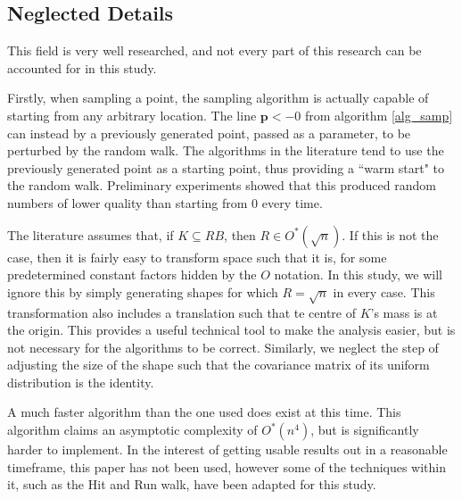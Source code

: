 \subsection{Neglected Details}

This field is very well researched, and not every part of this research can be accounted for in this study.

Firstly, when sampling a point, the sampling algorithm is actually capable of starting from any arbitrary location. The line ${\bm p} <- 0$ from algorithm \ref{alg_samp} can instead by a previously generated point, passed as a parameter, to be perturbed by the random walk. The algorithms in the literature tend to use the previously generated point as a starting point, thus providing a ``warm start" to the random walk. Preliminary experiments showed that this produced random numbers of lower quality than starting from $0$ every time.

The literature assumes that, if $K \subseteq RB$, then $R \in O^{*}(\sqrt{n})$. If this is not the case, then it is fairly easy to transform space such that it is, for some predetermined constant factors hidden by the $O$ notation. In this study, we will ignore this by simply generating shapes for which $R = \sqrt{n}$ in every case. This transformation also includes a translation such that te centre of $K$'s mass is at the origin. This provides a useful technical tool to make the analysis easier, but is not necessary for the algorithms to be correct. Similarly, we neglect the step of adjusting the size of the shape such that the covariance matrix of its uniform distribution is the identity.

A much faster algorithm than the one used does exist at this time. %
This algorithm claims an asymptotic complexity of $O^{*}(n^4)$, but is significantly harder to implement. In the interest of getting usable results out in a reasonable timeframe, this paper has not been used, however some of the techniques within it, such as the Hit and Run walk, have been adapted for this study.
